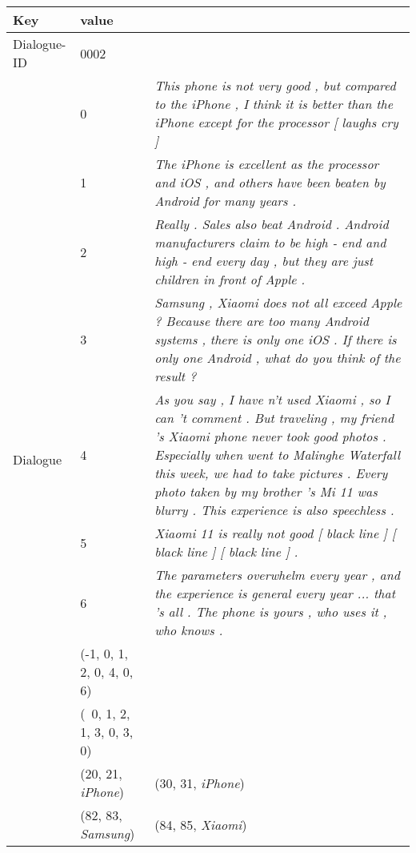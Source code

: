 \documentclass[11pt]{article}
\begin{document}
\begin{table*}[!ht]
\renewcommand\arraystretch{1.35}
\fontsize{11}{11.5}\selectfont
    \centering
\begin{tabular}{l l p{7cm} p{6cm}} 
  \hline
  Key & \multicolumn{2}{l}{value}\\
  \hline
  Dialogue-ID & \multicolumn{2}{l}{0002}\\
  \hline
  \multirow{14}{*}{Dialogue}  & 0 & \multicolumn{2}{p{12.5cm}}{\textit{ This phone is not very good , but compared to the iPhone , I think it is better than the iPhone except for  the processor [ laughs cry ] } }\\
    & 1  &  \multicolumn{2}{p{12.5cm}}{\textit{ The iPhone is excellent as the processor and iOS , and others have been beaten by Android for many years .} }\\
    & 2 &  \multicolumn{2}{p{12.5cm}}{\textit{ Really . Sales also beat Android . Android manufacturers claim to be high - end and high - end every day , but they are just children in front of Apple .} }\\
    & 3 & \multicolumn{2}{p{12.5cm}}{\textit{  Samsung , Xiaomi does not all exceed Apple ? Because there are too many Android systems , there is only one iOS . If there is only one Android , what do you think of the result ? } }\\
    & 4 & \multicolumn{2}{p{12.5cm}}{\textit{  As you say , I have n't used Xiaomi , so I can 't comment . But traveling , my friend 's Xiaomi phone never took good photos . Especially when went to Malinghe Waterfall this week, we had to take pictures . Every photo taken by my brother 's Mi 11 was blurry . This experience is also speechless . } }\\
    & 5 & \multicolumn{2}{p{12.5cm}}{\textit{  Xiaomi 11 is really not good [ black line ] [ black line ] [ black line ] . } }\\
    & 6 & \multicolumn{2}{p{12.5cm}}{\textit{  The parameters overwhelm every year , and the experience is general every year ... that 's all . The phone is yours , who uses it , who knows . } }\\
  \hline
    Replies & \multicolumn{2}{l}{(-1, 0, 1, 2, 0, 4, 0, 6)}\\
    Speakers &  \multicolumn{2}{l}{(\ 0, 1, 2, 1, 3, 0, 3, 0)} \\
  \hline
      \multirow{4}{*}{Targets} & \multicolumn{2}{p{6cm}}{ (20, 21, \textit{iPhone})} & (30, 31, \textit{iPhone}) \\
    & \multicolumn{2}{p{6cm}}{ (82, 83, \textit{Samsung})} & (84, 85, \textit{Xiaomi}) \\

\end{tabular}
\end{table*}
\end{document}
